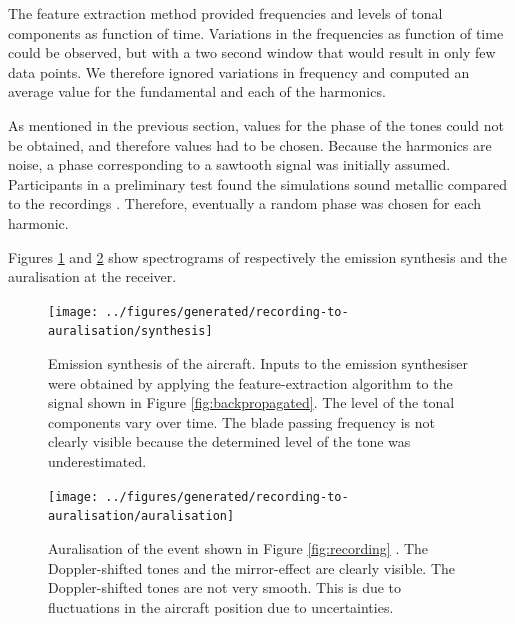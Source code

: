 The feature extraction method provided frequencies and levels of tonal
components as function of time. Variations in the frequencies as function of
time could be observed, but with a two second window that would result in only
few data points. We therefore ignored variations in frequency and computed an
average value for the fundamental and each of the harmonics.

As mentioned in the previous section, values for the phase of the tones could not be obtained, and therefore values had to be chosen.
Because the harmonics are  noise, a phase corresponding to a sawtooth
signal was initially assumed. Participants in a preliminary test found the simulations
sound metallic compared to the recordings \cite{Rietdijk2016a}. Therefore, eventually a random phase
was chosen for each harmonic.

Figures \ref{fig:synthesis} and \ref{fig:auralisation} show spectrograms of respectively the emission synthesis and the auralisation at the receiver.

\begin{figure}[H]
  \centering
  \texttt{[image: ../figures/generated/recording-to-auralisation/synthesis]}
  \caption{Emission synthesis of the aircraft. Inputs to the emission synthesiser were obtained by applying the feature-extraction algorithm to the signal shown in Figure \ref{fig:backpropagated}. The level of the tonal components vary over time. The blade passing frequency is not clearly visible because the determined level of the tone was underestimated.}
  \label{fig:synthesis}
\end{figure}


\begin{figure}[H]
  \centering
  \texttt{[image: ../figures/generated/recording-to-auralisation/auralisation]}
  \caption{Auralisation of the event shown in Figure \ref{fig:recording} .
  The Doppler-shifted tones and the mirror-effect are clearly visible. The Doppler-shifted tones are not very smooth. This is due to fluctuations in the aircraft position due to uncertainties.}
  \label{fig:auralisation}
\end{figure}



